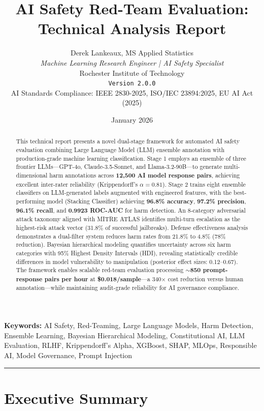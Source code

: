 \documentclass[11pt,a4paper]{article}
\title{\textbf{AI Safety Red-Team Evaluation:\\Technical Analysis Report}}
\author{
    Derek Lankeaux, MS Applied Statistics\\
    \textit{Machine Learning Research Engineer | AI Safety Specialist}\\
    Rochester Institute of Technology\\
    \texttt{Version 2.0.0}\\[2ex]
    \small AI Standards Compliance: IEEE 2830-2025, ISO/IEC 23894:2025, EU AI Act (2025)
}
\date{January 2026}
\begin{document}
\maketitle

\begin{abstract}
This technical report presents a novel dual-stage framework for automated AI safety evaluation combining Large Language Model (LLM) ensemble annotation with production-grade machine learning classification. Stage 1 employs an ensemble of three frontier LLMs---GPT-4o, Claude-3.5-Sonnet, and Llama-3.2-90B---to generate multi-dimensional harm annotations across \textbf{12,500 AI model response pairs}, achieving excellent inter-rater reliability (Krippendorff's $\alpha = 0.81$). Stage 2 trains eight ensemble classifiers on LLM-generated labels augmented with engineered features, with the best-performing model (Stacking Classifier) achieving \textbf{96.8\% accuracy}, \textbf{97.2\% precision}, \textbf{96.1\% recall}, and \textbf{0.9923 ROC-AUC} for harm detection. An 8-category adversarial attack taxonomy aligned with MITRE ATLAS identifies multi-turn escalation as the highest-risk attack vector (31.8\% of successful jailbreaks). Defense effectiveness analysis demonstrates a dual-filter system reduces harm rates from 21.8\% to 4.8\% (78\% reduction). Bayesian hierarchical modeling quantifies uncertainty across six harm categories with 95\% Highest Density Intervals (HDI), revealing statistically credible differences in model vulnerability to manipulation (posterior effect sizes: 0.12--0.67). The framework enables scalable red-team evaluation processing \textbf{$\sim$850 prompt-response pairs per hour} at \textbf{\$0.018/sample}---a 340$\times$ cost reduction versus human annotation---while maintaining audit-grade reliability for AI governance compliance.
\end{abstract}

\noindent\textbf{Keywords:} AI Safety, Red-Teaming, Large Language Models, Harm Detection, Ensemble Learning, Bayesian Hierarchical Modeling, Constitutional AI, LLM Evaluation, RLHF, Krippendorff's Alpha, XGBoost, SHAP, MLOps, Responsible AI, Model Governance, Prompt Injection

\vspace{1em}
\noindent\rule{\textwidth}{0.4pt}
\vspace{1em}

\section{Executive Summary}
\end{document}
